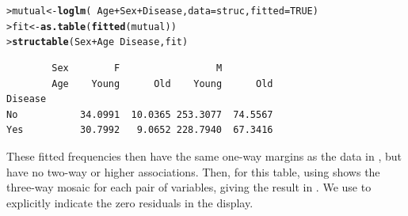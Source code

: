 \documentclass[10pt,krantz2]{krantz}\usepackage[]{graphicx}\usepackage[]{color}
\makeatletter
\newcommand{\hlnum}[1]{\textcolor[rgb]{0.686,0.059,0.569}{#1}}%
\newcommand{\hlopt}[1]{\textcolor[rgb]{0,0,0}{#1}}%
\newcommand{\hlstd}[1]{\textcolor[rgb]{0.345,0.345,0.345}{#1}}%
\newcommand{\hlkwb}[1]{\textcolor[rgb]{0.69,0.353,0.396}{#1}}%
\newcommand{\hlkwc}[1]{\textcolor[rgb]{0.333,0.667,0.333}{#1}}%
\newcommand{\hlkwd}[1]{\textcolor[rgb]{0.737,0.353,0.396}{\textbf{#1}}}%
\newenvironment{kframe}{%
 \def\at@end@of@kframe{}%
 \ifinner\ifhmode%
  \def\at@end@of@kframe{\end{minipage}}%
  \begin{minipage}{\columnwidth}%
 \fi\fi%
 \def\FrameCommand##1{\hskip\@totalleftmargin \hskip-\fboxsep
 \colorbox{shadecolor}{##1}\hskip-\fboxsep
     \hskip-\linewidth \hskip-\@totalleftmargin \hskip\columnwidth}%
 \MakeFramed {\advance\hsize-\width
   \@totalleftmargin\z@ \linewidth\hsize
   \@setminipage}}%
 {\par\unskip\endMakeFramed%
 \at@end@of@kframe}
\newenvironment{knitrout}{}{} %
\renewenvironment{knitrout}{\small\renewcommand{\baselinestretch}{.85}}{} %
\makeatother
\begin{document}
\begin{knitrout}
\color{fgcolor}\begin{kframe}
\begin{alltt}
\hlstd{> }\hlstd{mutual} \hlkwb{<-} \hlkwd{loglm}\hlstd{(}\hlopt{~} \hlstd{Age} \hlopt{+} \hlstd{Sex} \hlopt{+} \hlstd{Disease,} \hlkwc{data} \hlstd{= struc,} \hlkwc{fitted} \hlstd{=} \hlnum{TRUE}\hlstd{)}
\hlstd{> }\hlstd{fit} \hlkwb{<-} \hlkwd{as.table}\hlstd{(}\hlkwd{fitted}\hlstd{(mutual))}
\hlstd{> }\hlkwd{structable}\hlstd{(Sex} \hlopt{+} \hlstd{Age} \hlopt{~} \hlstd{Disease, fit)}
\end{alltt}
\begin{verbatim}
        Sex        F                 M         
        Age    Young      Old    Young      Old
Disease                                        
No           34.0991  10.0365 253.3077  74.5567
Yes          30.7992   9.0652 228.7940  67.3416
\end{verbatim}
\end{kframe}
\end{knitrout}
These fitted frequencies then have the same one-way margins as the
data in , but have no two-way or higher associations.
Then,  for this table, using 
shows the three-way mosaic for each pair of variables, giving
the result in .  We use 
to explicitly indicate the zero residuals in the display.
\end{document}
